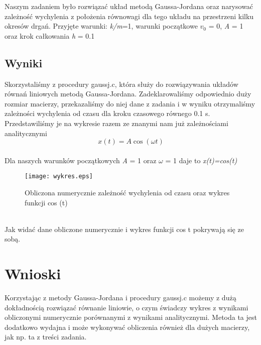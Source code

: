 \documentclass{article}
\begin{document}
Naszym zadaniem było rozwiązać układ metodą Gaussa-Jordana oraz narysować zależność wychylenia z położenia równowagi dla tego układu na przestrzeni kilku okresów drgań. Przyjęte warunki: \textit{k/m}=1, warunki początkowe $v_0$ = 0, \textit{A} = 1 oraz krok całkowania \textit{h} = 0.1

\subsection{Wyniki}
Skorzystaliśmy z procedury gaussj.c, która służy do rozwiązywania układów równań liniowych metodą Gaussa-Jordana. Zadeklarowaliśmy odpowiednio duży rozmiar macierzy, przekazaliśmy do niej dane z zadania i w wyniku otrzymaliśmy zależności wychylenia od czasu dla kroku czasowego równego 0.1 s. Przedstawiliśmy je na wykresie razem ze znanymi nam już zależnościami analitycznymi 
\\
\begin{equation}
	x(t)=A \cos(\omega t)
\end{equation}
\\
Dla naszych warunków początkowych \textit{A} = 1 oraz $\omega$ = 1 daje to \textit{x(t)=cos(t)}
\\
\begin{figure}[h]
\texttt{[image: wykres.eps]}
\centering
\caption{Obliczona numerycznie zależność wychylenia od czasu oraz wykres funkcji cos (t) }
\end{figure}
\\
Jak widać dane obliczone numerycznie i wykres funkcji cos t pokrywają się ze sobą. 
\\
\section{Wnioski}

Korzystając z metody Gaussa-Jordana i procedury gaussj.c możemy z dużą dokładnością rozwiązać równanie liniowie, o czym świadczy wykres z wynikami obliczonymi numerycznie porównanymi z wynikami analitycznymi. Metoda ta jest dodatkowo wydajna i może wykonywać obliczenia również dla dużych macierzy, jak np. ta z treści zadania. 
	
\end{document}
